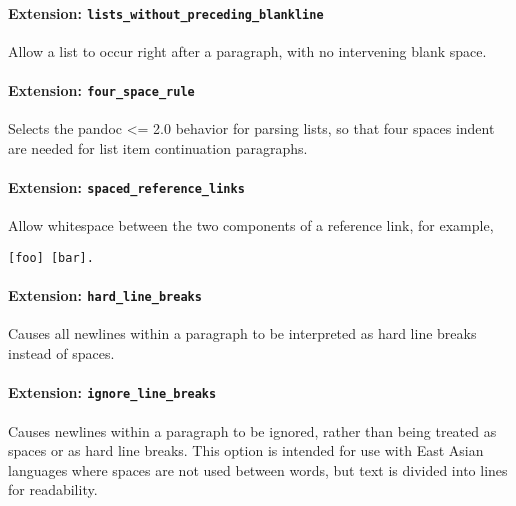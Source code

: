 \documentclass[
]{article}
\begin{document}
\paragraph{\texorpdfstring{Extension:
\texttt{lists\_without\_preceding\_blankline}}{Extension: lists\_without\_preceding\_blankline}}\label{extension-lists_without_preceding_blankline}

Allow a list to occur right after a paragraph, with no intervening blank
space.

\paragraph{\texorpdfstring{Extension:
\texttt{four\_space\_rule}}{Extension: four\_space\_rule}}\label{extension-four_space_rule}

Selects the pandoc \textless= 2.0 behavior for parsing lists, so that
four spaces indent are needed for list item continuation paragraphs.

\paragraph{\texorpdfstring{Extension:
\texttt{spaced\_reference\_links}}{Extension: spaced\_reference\_links}}\label{extension-spaced_reference_links}

Allow whitespace between the two components of a reference link, for
example,

\begin{verbatim}
[foo] [bar].
\end{verbatim}

\paragraph{\texorpdfstring{Extension:
\texttt{hard\_line\_breaks}}{Extension: hard\_line\_breaks}}\label{extension-hard_line_breaks}

Causes all newlines within a paragraph to be interpreted as hard line
breaks instead of spaces.

\paragraph{\texorpdfstring{Extension:
\texttt{ignore\_line\_breaks}}{Extension: ignore\_line\_breaks}}\label{extension-ignore_line_breaks}

Causes newlines within a paragraph to be ignored, rather than being
treated as spaces or as hard line breaks. This option is intended for
use with East Asian languages where spaces are not used between words,
but text is divided into lines for readability.
\end{document}
